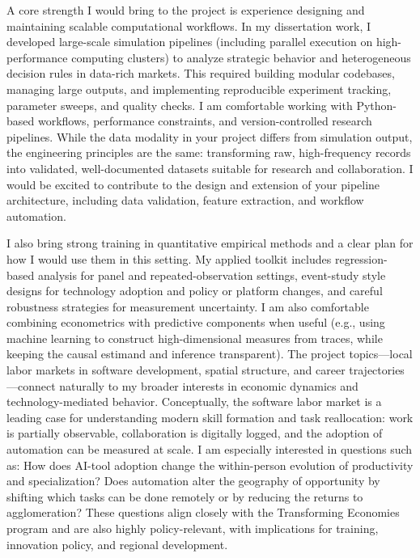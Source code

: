 \documentclass[11pt]{article}
\begin{document}
A core strength I would bring to the project is experience designing and maintaining scalable computational workflows. In my dissertation work, I developed large-scale simulation pipelines (including parallel execution on high-performance computing clusters) to analyze strategic behavior and heterogeneous decision rules in data-rich markets. This required building modular codebases, managing large outputs, and implementing reproducible experiment tracking, parameter sweeps, and quality checks. I am comfortable working with Python-based workflows, performance constraints, and version-controlled research pipelines. While the data modality in your project differs from simulation output, the engineering principles are the same: transforming raw, high-frequency records into validated, well-documented datasets suitable for research and collaboration. I would be excited to contribute to the design and extension of your pipeline architecture, including data validation, feature extraction, and workflow automation.

I also bring strong training in quantitative empirical methods and a clear plan for how I would use them in this setting. My applied toolkit includes regression-based analysis for panel and repeated-observation settings, event-study style designs for technology adoption and policy or platform changes, and careful robustness strategies for measurement uncertainty. 
I am also comfortable combining econometrics with predictive components when useful (e.g., using machine learning to construct high-dimensional measures from traces, while keeping the causal estimand and inference transparent). 
The project topics---local labor markets in software development, spatial structure, and career trajectories---connect naturally to my broader interests in economic dynamics and technology-mediated behavior. Conceptually, the software labor market is a leading case for understanding modern skill formation and task reallocation: work is partially observable, collaboration is digitally logged, and the adoption of automation can be measured at scale. I am especially interested in questions such as: How does AI-tool adoption change the within-person evolution of productivity and specialization? Does automation alter the geography of opportunity by shifting which tasks can be done remotely or by reducing the returns to agglomeration? 
These questions align closely with the Transforming Economies program and are also highly policy-relevant, with implications for training, innovation policy, and regional development.
\end{document}
